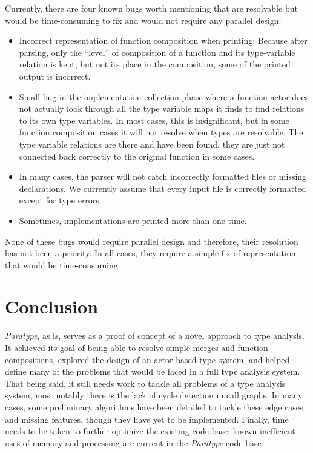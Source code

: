 \documentclass{acm_proc_article-sp}
\begin{document}
Currently, there are four known bugs worth mentioning that are resolvable but
would be time-consuming to fix and would not require any parallel design:
\begin{itemize}
	\item Incorrect representation of function composition when printing:
		Because after parsing, only the ``level'' of composition of a function
		and its type-variable relation is kept, but not its place in the
		composition, some of the printed output is incorrect. 
	\item Small bug in the implementation collection phase where a function
		actor does not actually look through all the type variable maps it
		finds to find relations to its own type variables. In most cases, this
		is insignificant, but in some function composition cases it will not
		resolve when types are resolvable. The type variable relations are
		there and have been found, they are just not connected back correctly
		to the original function in some cases.
	\item In many cases, the parser will not catch incorrectly formatted files
		or missing declarations. We currently assume that every input file is
		correctly formatted except for type errors.
	\item Sometimes, implementations are printed more than one time.
\end{itemize}

None of these bugs would require parallel design and therefore, their
resolution has not been a priority. In all cases, they require a
simple fix of representation that would be time-consuming.


\section{Conclusion}

\emph{Paratype}, as is, serves as a proof of concept of a novel approach to
type analysis. It achieved its goal of being able to resolve simple merges and
function compositions, explored the design of an actor-based type system, and
helped define many of the problems that would be faced in a full type analysis
system. That being said, it still needs work to tackle all problems of a type
analysis system, most notably there is the lack of cycle detection in call
graphs. In many cases, some preliminary algorithms have been detailed to tackle
these edge cases and missing features, though they have yet to be implemented.
Finally, time needs to be taken to further optimize the existing code base;
known inefficient uses of memory and processing are current in the
\emph{Paratype} code base.
\end{document}
